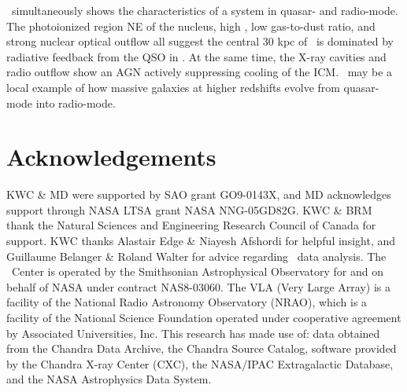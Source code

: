 \documentclass[useAMS,usenatbib]{mn2e}
\begin{document}
\irs\ simultaneously shows the characteristics of a system in quasar-
and radio-mode. The photoionized region NE of the nucleus, high \leff,
low gas-to-dust ratio, and strong nuclear optical outflow all suggest
the central 30 kpc of \rxj\ is dominated by radiative feedback from
the QSO in \irs. At the same time, the X-ray cavities and radio
outflow show an AGN actively suppressing cooling of the ICM. \irs\ may
be a local example of how massive galaxies at higher redshifts evolve
from quasar-mode into radio-mode. 

\section*{Acknowledgements}

KWC \& MD were supported by SAO grant GO9-0143X, and MD acknowledges
support through NASA LTSA grant NASA NNG-05GD82G. KWC \& BRM thank the
Natural Sciences and Engineering Research Council of Canada for
support. KWC thanks Alastair Edge \& Niayesh Afshordi for helpful
insight, and Guillaume Belanger \& Roland Walter for advice regarding
\integral\ data analysis. The \cxo\ Center is operated by the
Smithsonian Astrophysical Observatory for and on behalf of NASA under
contract NAS8-03060. The VLA (Very Large Array) is a facility of the
National Radio Astronomy Observatory (NRAO), which is a facility of
the National Science Foundation operated under cooperative agreement
by Associated Universities, Inc. This research has made use of: data
obtained from the Chandra Data Archive, the Chandra Source Catalog,
software provided by the Chandra X-ray Center (CXC), the NASA/IPAC
Extragalactic Database, and the NASA Astrophysics Data System.






\clearpage
\onecolumn







\label{lastpage}
\end{document}
